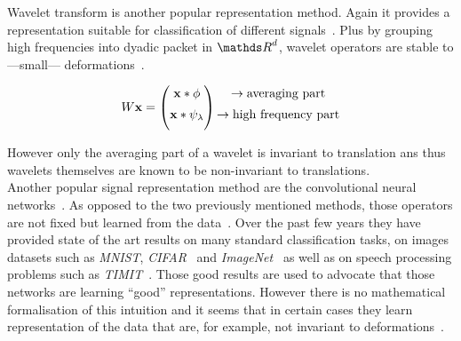 \documentclass[a4paper,11pt]{report}
\begin{document}
			Wavelet transform is another popular representation method. Again it provides a representation suitable for classification of different signals~\citep{de2000using}. Plus by grouping high frequencies into dyadic packet in $\dsR^{d}$, wavelet operators are stable to ---small--- deformations~\citep{bruna2013invariant}.  %
			
			\begin{equation}
				\begin{matrix}
					W{\bf x} =
					\begin{pmatrix}
						{\bf x} \ast \phi \\[0.5em]
						{\bf x} \ast \psi_{\lambda} \\[0.5em]
					\end{pmatrix}
					\begin{aligned}
						\begin{matrix}
							\rightarrow \text{averaging part}				\\[0.5em]
							\rightarrow \text{high frequency part}	\\[0.5em]
						\end{matrix}
					\end{aligned}
				\end{matrix}
			\end{equation}
		
			However only the averaging part of a wavelet is invariant to translation ans thus wavelets themselves are known to be non-invariant to translations.\\
			
			Another popular signal representation method are the convolutional neural networks~\citep{lecun1995convolutional}. As opposed to the two previously mentioned methods, those operators are not fixed but learned from the data~\citep{simard2003best}. Over the past few years they have provided state of the art results on many standard classification tasks, on images datasets such as \textit{MNIST}, \textit{CIFAR}~\citep{hinton2012improving} and \textit{ImageNet}~\citep{krizhevsky2012imagenet} as well as on speech processing problems such as \textit{TIMIT}~\citep{abdel2012applying}. Those good results are used to advocate that those networks are learning ``good'' representations. However there is no mathematical formalisation of this intuition and it seems that in certain cases they learn representation of the data that are, for example, not invariant to deformations~\citep{szegedy2013intriguing}.\\
			
\end{document}
